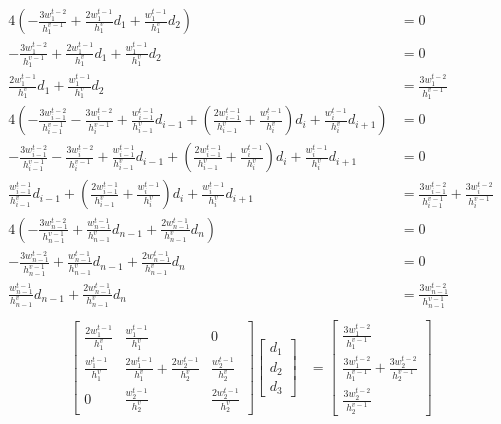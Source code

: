 \documentclass{article}
\begin{document}
\begin{align*}
  4\left(-\frac{3w_1^{t-2}}{h_1^{v-1}}+\frac{2w_1^{t-1}}{h_1^v}d_1+\frac{w_1^{t-1}}{h_1^v}d_2\right)
  &= 0 \\
  -\frac{3w_1^{t-2}}{h_1^{v-1}}+\frac{2w_1^{t-1}}{h_1^v}d_1+\frac{w_1^{t-1}}{h_1^v}d_2
  &= 0 \\
  \frac{2w_1^{t-1}}{h_1^v}d_1+\frac{w_1^{t-1}}{h_1^v}d_2
  &= \frac{3w_1^{t-2}}{h_1^{v-1}} \\
  4\left(
  -\frac{3w_{i-1}^{t-2}}{h_{i-1}^{v-1}}-\frac{3w_i^{t-2}}{h_i^{v-1}}
  +\frac{w_{i-1}^{t-1}}{h_{i-1}^v}d_{i-1}
  +\left(\frac{2w_{i-1}^{t-1}}{h_{i-1}^v}+\frac{w_i^{t-1}}{h_i^v}\right)d_i
  +\frac{w_i^{t-1}}{h_i^v}d_{i+1}
  \right)
  &= 0 \\
  -\frac{3w_{i-1}^{t-2}}{h_{i-1}^{v-1}}-\frac{3w_i^{t-2}}{h_i^{v-1}}
  +\frac{w_{i-1}^{t-1}}{h_{i-1}^v}d_{i-1}
  +\left(\frac{2w_{i-1}^{t-1}}{h_{i-1}^v}+\frac{w_i^{t-1}}{h_i^v}\right)d_i
  +\frac{w_i^{t-1}}{h_i^v}d_{i+1}
  &= 0 \\
  \frac{w_{i-1}^{t-1}}{h_{i-1}^v}d_{i-1}
  +\left(\frac{2w_{i-1}^{t-1}}{h_{i-1}^v}+\frac{w_i^{t-1}}{h_i^v}\right)d_i
  +\frac{w_i^{t-1}}{h_i^v}d_{i+1}
  &= \frac{3w_{i-1}^{t-2}}{h_{i-1}^{v-1}}+\frac{3w_i^{t-2}}{h_i^{v-1}} \\
  4\left(-\frac{3w_{n-1}^{t-2}}{h_{n-1}^{v-1}}+\frac{w_{n-1}^{t-1}}{h_{n-1}^v}d_{n-1}+\frac{2w_{n-1}^{t-1}}{h_{n-1}^v}d_n\right)
  &= 0 \\
  -\frac{3w_{n-1}^{t-2}}{h_{n-1}^{v-1}}+\frac{w_{n-1}^{t-1}}{h_{n-1}^v}d_{n-1}+\frac{2w_{n-1}^{t-1}}{h_{n-1}^v}d_n
  &= 0 \\
  \frac{w_{n-1}^{t-1}}{h_{n-1}^v}d_{n-1}+\frac{2w_{n-1}^{t-1}}{h_{n-1}^v}d_n
  &= \frac{3w_{n-1}^{t-2}}{h_{n-1}^{v-1}} \\
\end{align*}
\begin{align*}
  \begin{bmatrix}
    \frac{2w_1^{t-1}}{h_1^v} & \frac{w_1^{t-1}}{h_1^v} & 0 \\
    \frac{w_1^{t-1}}{h_1^v} & \frac{2w_1^{t-1}}{h_1^v}+\frac{2w_2^{t-1}}{h_2^v} & \frac{w_2^{t-1}}{h_2^v} \\
    0 & \frac{w_2^{t-1}}{h_2^v} & \frac{2w_2^{t-1}}{h_2^v}
  \end{bmatrix}
  \begin{bmatrix}
    d_1 \\ d_2 \\ d_3
  \end{bmatrix}
  &= 
  \begin{bmatrix}
    \frac{3w_1^{t-2}}{h_1^{v-1}} \\
    \frac{3w_1^{t-2}}{h_1^{v-1}}+\frac{3w_2^{t-2}}{h_2^{v-1}} \\
    \frac{3w_2^{t-2}}{h_2^{v-1}}
  \end{bmatrix}
\end{align*}
\end{document}
